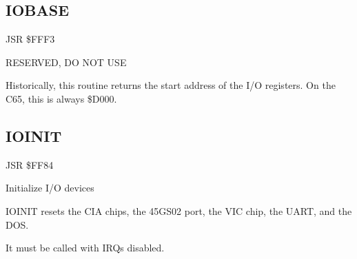 
\newpage
\subsection{IOBASE}
\label{KERNAL Jump Table!IOBASE}
\begin{description}[leftmargin=2cm,style=nextline]
    \item [Address:] JSR \$FFF3
    \item [Description:] RESERVED, DO NOT USE
    \item [Remarks:]
        Historically, this routine returns the start address of the I/O registers. On the C65, this is always \$D000.
\end{description}



\newpage
\subsection{IOINIT}
\label{KERNAL Jump Table!IOINIT}
\begin{description}[leftmargin=2cm,style=nextline]
    \item [Address:] JSR \$FF84
    \item [Description:] Initialize I/O devices
    \item [Remarks:]
        IOINIT resets the CIA chips, the 45GS02 port, the VIC chip, the UART, and the DOS.

        It must be called with IRQs disabled.
    \item [Example:]
\end{description}



\newpage
